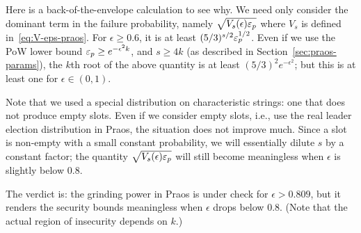 Here is a back-of-the-envelope calculation to see why. 
We need only consider the dominant term in the failure probability, 
namely $\sqrt{V_s(\epsilon) \mathsf{\varepsilon}_p}$ where $V_s$ is defined in~\eqref{eq:V-eps-praos}. 
For $\epsilon \geq 0.6$, it is at least $(5/3)^{s/2} \mathsf{\varepsilon}_p^{1/2}$. 
Even if we use the PoW lower bound $\mathsf{\varepsilon}_p \geq e^{-\epsilon^2 k}$,\cite{PoWLowerBound} 
and $s \geq 4 k$ (as described in Section~\ref{sec:praos-params}),
the $k$th root of the above quantity 
is at least $(5/3)^2 e^{-\epsilon^2}$; 
but this is at least one for $\epsilon \in (0,1)$.

Note that we used a special distribution on characteristic strings: 
one that does not produce empty slots. 
Even if we consider empty slots, i.e., 
use the real leader election distribution in Praos, 
the situation does not improve much. 
Since a slot is non-empty with a small constant probability, 
we will essentially dilute $s$ by a constant factor; 
the quantity $\sqrt{V_s(\epsilon) \mathsf{\varepsilon}_p}$ will still become meaningless 
when $\epsilon$ is slightly below $0.8$.

The verdict is: the grinding power in Praos is under check for $\epsilon > 0.809$, 
but it renders the security bounds meaningless when $\epsilon$ drops below $0.8$. 
(Note that the actual region of insecurity depends on $k$.)


